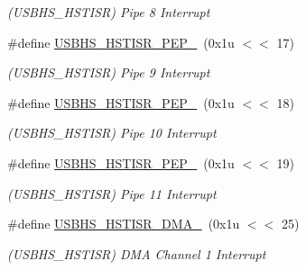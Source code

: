 \begin{DoxyCompactItemize}
\begin{DoxyCompactList}\small\item\em (U\+S\+B\+H\+S\+\_\+\+H\+S\+T\+I\+SR) Pipe 8 Interrupt \end{DoxyCompactList}\item 
\mbox{\label{group__SAMS70__USBHS_gaf1b98d4261f02c234ecef07686ec814f}} 
\#define \mbox{\hyperlink{group__SAMS70__USBHS_gaf1b98d4261f02c234ecef07686ec814f}{U\+S\+B\+H\+S\+\_\+\+H\+S\+T\+I\+S\+R\+\_\+\+P\+E\+P\+\_}}~(0x1u $<$$<$ 17)
\begin{DoxyCompactList}\small\item\em (U\+S\+B\+H\+S\+\_\+\+H\+S\+T\+I\+SR) Pipe 9 Interrupt \end{DoxyCompactList}\item 
\mbox{\label{group__SAMS70__USBHS_ga3edeb390c47bd11351a88bd21bd37fbb}} 
\#define \mbox{\hyperlink{group__SAMS70__USBHS_ga3edeb390c47bd11351a88bd21bd37fbb}{U\+S\+B\+H\+S\+\_\+\+H\+S\+T\+I\+S\+R\+\_\+\+P\+E\+P\+\_}}~(0x1u $<$$<$ 18)
\begin{DoxyCompactList}\small\item\em (U\+S\+B\+H\+S\+\_\+\+H\+S\+T\+I\+SR) Pipe 10 Interrupt \end{DoxyCompactList}\item 
\mbox{\label{group__SAMS70__USBHS_ga328dc807c6a17858f0ef7c0ebad45a4e}} 
\#define \mbox{\hyperlink{group__SAMS70__USBHS_ga328dc807c6a17858f0ef7c0ebad45a4e}{U\+S\+B\+H\+S\+\_\+\+H\+S\+T\+I\+S\+R\+\_\+\+P\+E\+P\+\_}}~(0x1u $<$$<$ 19)
\begin{DoxyCompactList}\small\item\em (U\+S\+B\+H\+S\+\_\+\+H\+S\+T\+I\+SR) Pipe 11 Interrupt \end{DoxyCompactList}\item 
\mbox{\label{group__SAMS70__USBHS_ga3ee89d916fbd2f900cc36c2b9ad1afa8}} 
\#define \mbox{\hyperlink{group__SAMS70__USBHS_ga3ee89d916fbd2f900cc36c2b9ad1afa8}{U\+S\+B\+H\+S\+\_\+\+H\+S\+T\+I\+S\+R\+\_\+\+D\+M\+A\+\_}}~(0x1u $<$$<$ 25)
\begin{DoxyCompactList}\small\item\em (U\+S\+B\+H\+S\+\_\+\+H\+S\+T\+I\+SR) D\+MA Channel 1 Interrupt \end{DoxyCompactList}\item 

\end{DoxyCompactItemize}
